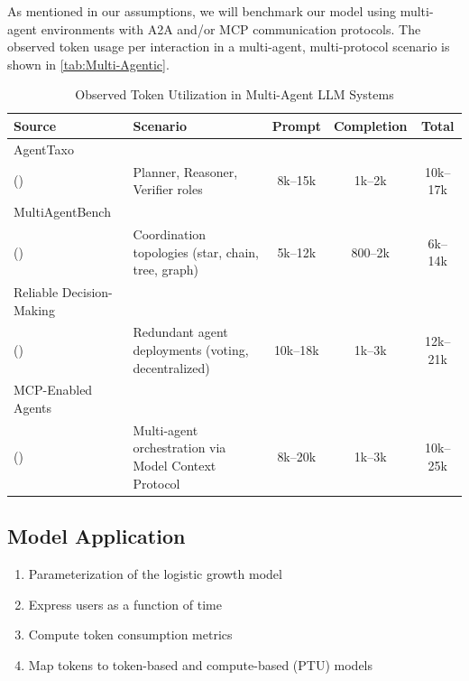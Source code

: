 \documentclass[10pt,twocolumn]{article}
\begin{document}
As mentioned in our assumptions, we will benchmark our model using multi-agent environments with A2A and/or MCP communication protocols. 
The observed token usage per interaction in a multi-agent, multi-protocol scenario is shown in \autoref{tab:Multi-Agentic}.
\begin{table}[ht]
\scriptsize   %
\setlength{\tabcolsep}{4pt} %
\renewcommand{\arraystretch}{1.1} %
\centering
\begin{tabularx}{\columnwidth}{ l X c c c }
\hline
\textbf{Source} & \textbf{Scenario} & \textbf{Prompt} & \textbf{Completion} & \textbf{Total} \\
\hline
AgentTaxo\\(\cite{wang2025agenttaxo}) 
& Planner, Reasoner, Verifier roles 
& 8k--15k & 1k--2k & 10k--17k \\

MultiAgentBench\\(\cite{zhu2025multiagentbenchevaluatingcollaborationcompetition})
& Coordination topologies (star, chain, tree, graph) 
& 5k--12k & 800--2k & 6k--14k \\

Reliable Decision-Making\\(\cite{Xian2025})
& Redundant agent deployments (voting, decentralized) 
& 10k--18k & 1k--3k & 12k--21k \\

MCP-Enabled Agents\\(\cite{ding2025networksystemsperformancecharacterization})
& Multi-agent orchestration via Model Context Protocol 
& 8k--20k & 1k--3k & 10k--25k \\
\hline
\end{tabularx}
\caption{Observed Token Utilization in Multi-Agent LLM Systems}
\label{tab:Multi-Agentic}
\end{table}

\subsection{Model Application}
\begin{enumerate}
	\item Parameterization of the logistic growth model
	\item Express users as a function of time
	\item Compute token consumption metrics
	\item Map tokens to token-based and compute-based (PTU) models
\end{enumerate}
\end{document}
